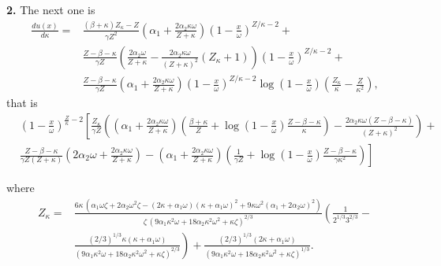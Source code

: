 \documentclass{article}
\begin{document}
\begin{appendices}
{\bf 2.} The next one is
\begin{equation}\label{eq:dk}
\begin{split}
  \frac{d u(x)}{d\kappa} =& \frac{(\beta+\kappa)Z_{\kappa}-Z}{\gamma Z^2}\left(\alpha_1 + \frac{2\alpha_2 \kappa\omega}{Z+\kappa}\right)\left(1-\frac{x}{\omega}\right)^{Z/\kappa-2}+\\
&  \frac{Z-\beta-\kappa}{\gamma Z} \left(\frac{2\alpha_2\omega}{Z+\kappa}-\frac{2\alpha_2\kappa\omega}{(Z+\kappa)^2}(Z_{\kappa}+1)\right)\left(1-\frac{x}{\omega}\right)^{Z/\kappa-2}+\\ 
& \frac{Z-\beta-\kappa}{\gamma Z}\left(\alpha_1+ \frac{2\alpha_2 \kappa\omega}{Z+\kappa}
\right)\left(1-\frac{x}{\omega}\right)^{Z/\kappa-2}\log\left(1-\frac{x}{\omega}\right)\left(\frac{Z_{\kappa}}{\kappa}-\frac{Z}{\kappa^2}\right), 
  \end{split}
\end{equation}
that is 
\begin{equation}\begin{split}
&\left(1-\frac{x}{\omega}\right)^{\frac{Z}{\kappa}-2} \left[ 
\frac{Z_{\kappa}}{\gamma Z }\left(\left(\alpha_1 + \frac{2\alpha_2 \kappa\omega}{Z+\kappa}\right)
  \left(\frac{\beta+\kappa}{Z}+ \log\left(1-\frac{x}{\omega}\right)\frac{Z-\beta-\kappa}{\kappa}\right)-\frac{2\alpha_2\kappa\omega(Z-\beta-\kappa)}{(Z+\kappa)^2} \right)+ \right.\\
  &\left.  \frac{Z-\beta-\kappa}{\gamma Z (Z+\kappa)}\left(2\alpha_2\omega + \frac{2\alpha_2\kappa\omega}{Z+\kappa}\right) - \left(\alpha_1 + \frac{2\alpha_2 \kappa\omega}{Z+\kappa}\right)\left(\frac1{\gamma Z}+\log\left(1-\frac{x}{\omega}\right)\frac{Z-\beta-\kappa}{\gamma\kappa^2} \right)       \right]
  \end{split}
\end{equation}

where
\begin{equation}\begin{split}
Z_{\kappa}=& \frac{6 \kappa\, (\alpha_1  \omega \zeta + 2 \alpha_2  \omega^2 \zeta - 
      (2 \kappa + \alpha_1 \omega) ( \kappa + \alpha_1  \omega)^2 + 9 \kappa \omega^2 ( \alpha_1 + 2 \alpha_2  \omega)^2)}{\zeta\, (9 \alpha_1 \kappa^2 \omega + 18 \alpha_2 \kappa^2 \omega^2 +\kappa \zeta)^{2/3}}\left( \frac{1}{ 2^{1/3}3^{2/3}} -\right. \\
    &\left.\frac{(2/3)^{1/3} \kappa ( \kappa +  \alpha_1  \omega)}{(9 \alpha_1 \kappa^2 \omega + 18 \alpha_2 \kappa^2 \omega^2 +\kappa \zeta)^{2/3}} \right) + \frac{ (2/3)^{1/3}( 2 \kappa +  \alpha_1 \omega)}{ (9 \alpha_1 \kappa^2 \omega + 18 \alpha_2 \kappa^2 \omega^2 +\kappa \zeta)^{1/3}}.
  \end{split}\end{equation}


\end{appendices}
\end{document}
